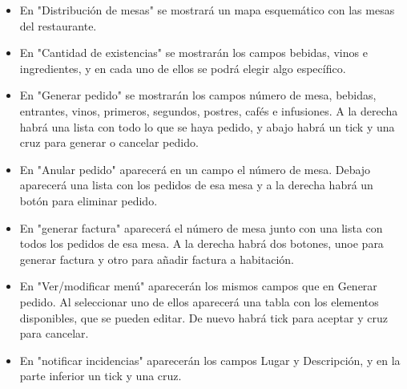 \documentclass[spanish,a4paper,12pt]{report}		%
\begin{document}
\begin{itemize}
\begin{itemize}
\begin{itemize}
						\item En "Distribución de mesas" se mostrará un mapa esquemático con las mesas del restaurante. 
						\item En "Cantidad de existencias" se mostrarán los campos bebidas, vinos e ingredientes, y en cada uno de ellos se podrá elegir algo específico. 
						\item En "Generar pedido" se mostrarán los campos número de mesa, bebidas, entrantes, vinos, primeros, segundos, postres, cafés e infusiones. A la derecha habrá una lista con todo lo que se haya pedido, y abajo habrá un tick y una cruz para generar o cancelar pedido. 
						\item En "Anular pedido" aparecerá en un campo el número de mesa. Debajo aparecerá una lista con los pedidos de esa mesa y a la derecha habrá un botón para eliminar pedido. 
						\item En "generar factura" aparecerá el número de mesa junto con una lista con todos los pedidos de esa mesa. A la derecha habrá dos botones, unoe para generar factura y otro para añadir factura a habitación.
						\item En "Ver/modificar menú" aparecerán los mismos campos que en Generar pedido. Al seleccionar uno de ellos aparecerá una tabla con los elementos disponibles, que se pueden editar. De nuevo habrá tick para aceptar y cruz para cancelar. 
						\item En "notificar incidencias" aparecerán los campos Lugar y Descripción, y en la parte inferior un tick y una cruz. 
					\end{itemize}
					

\end{itemize}
\end{itemize}
\end{document}
